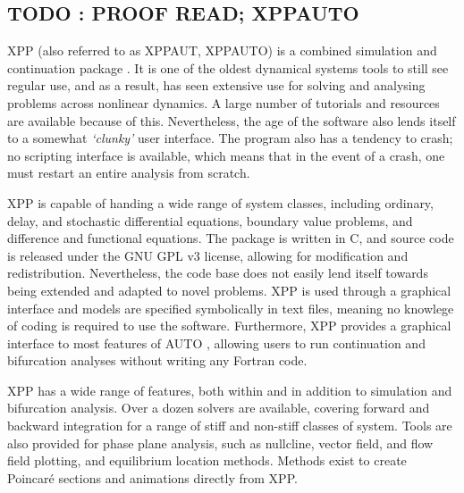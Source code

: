 \documentclass[a4paper,twoside]{article}
\begin{document}
\subsection{{\bfseries\sffamily TODO} : PROOF READ; XPPAUTO}
\label{sec:org898b79c}

XPP (also referred to as XPPAUT, XPPAUTO) is a combined simulation and continuation package \cite{ermentrout2002simulating}.
It is one of the oldest dynamical systems tools to still see regular use, and as a result, has seen extensive use for solving and analysing problems across nonlinear dynamics.
A large number of tutorials and resources are available because of this.
Nevertheless, the age of the software also lends itself to a somewhat \emph{`clunky'} user interface.
The program also has a tendency to crash; no scripting interface is available, which means that in the event of a crash, one must restart an entire analysis from scratch.

XPP is capable of handing a wide range of system classes, including ordinary, delay, and stochastic differential equations, boundary value problems, and difference and functional equations.
The package is written in C, and source code is released under the GNU GPL v3 license, allowing for modification and redistribution.
Nevertheless, the code base does not easily lend itself towards being extended and adapted to novel problems.
XPP is used through a graphical interface and models are specified symbolically in text files, meaning no knowlege of coding is required to use the software.
Furthermore, XPP provides a graphical interface to most features of AUTO \cite{dhooge2008new,doedel1981auto}, allowing users to run continuation and bifurcation analyses without writing any Fortran code.

XPP has a wide range of features, both within and in addition to simulation and bifurcation analysis.
Over a dozen solvers are available, covering forward and backward integration for a range of stiff and non-stiff classes of system.
Tools are also provided for phase plane analysis, such as nullcline, vector field, and flow field plotting, and equilibrium location methods.
Methods exist to create Poincar\'{e} sections and animations directly from XPP.
\end{document}

